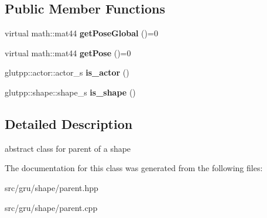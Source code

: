 \subsection*{\-Public \-Member \-Functions}
\begin{DoxyCompactItemize}
\item 
\hypertarget{classglutpp_1_1shape_1_1parent_a03e51f41b32afe34a21e63c38de5c0e9}{virtual math\-::mat44 {\bfseries get\-Pose\-Global} ()=0}\label{classglutpp_1_1shape_1_1parent_a03e51f41b32afe34a21e63c38de5c0e9}

\item 
\hypertarget{classglutpp_1_1shape_1_1parent_a8a7966c644061e1c87da2d539443fa16}{virtual math\-::mat44 {\bfseries get\-Pose} ()=0}\label{classglutpp_1_1shape_1_1parent_a8a7966c644061e1c87da2d539443fa16}

\item 
\hypertarget{classglutpp_1_1shape_1_1parent_a3751fcc84d5337c607204b2e1d3efc2f}{glutpp\-::actor\-::actor\-\_\-s {\bfseries is\-\_\-actor} ()}\label{classglutpp_1_1shape_1_1parent_a3751fcc84d5337c607204b2e1d3efc2f}

\item 
\hypertarget{classglutpp_1_1shape_1_1parent_aa56920af8e7e92cd4a8557abe9cc6e4a}{glutpp\-::shape\-::shape\-\_\-s {\bfseries is\-\_\-shape} ()}\label{classglutpp_1_1shape_1_1parent_aa56920af8e7e92cd4a8557abe9cc6e4a}

\end{DoxyCompactItemize}


\subsection{\-Detailed \-Description}
abstract class for parent of a shape 

\-The documentation for this class was generated from the following files\-:\begin{DoxyCompactItemize}
\item 
src/gru/shape/parent.\-hpp\item 
src/gru/shape/parent.\-cpp\end{DoxyCompactItemize}
